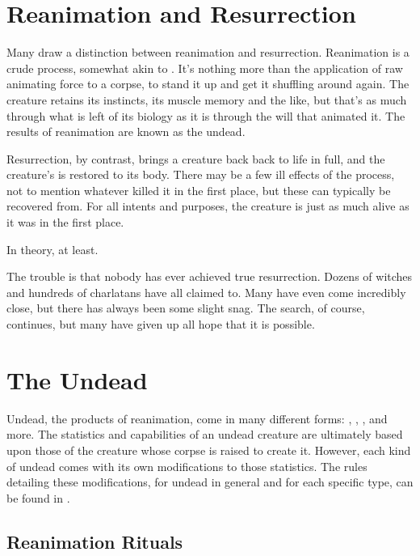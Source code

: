 
\section{Reanimation and Resurrection}

Many  draw a distinction between reanimation and resurrection.
Reanimation is a crude process, somewhat akin to .
It's nothing more than the application of raw animating force to a corpse, to stand it up and get it shuffling around again.
The creature retains its instincts, its muscle memory and the like, but that's as much through what is left of its biology as it is through the will that animated it.
The results of reanimation are known as the undead.

Resurrection, by contrast, brings a creature back back to life in full, and the creature's {\soul} is restored to its body.
There may be a few ill effects of the process, not to mention whatever killed it in the first place, but these can typically be recovered from.
For all intents and purposes, the creature is just as much alive as it was in the first place.

In theory, at least.

The trouble is that nobody has ever achieved true resurrection.
Dozens of witches and hundreds of charlatans have all claimed to.
Many have even come incredibly close, but there has always been some slight snag.
The search, of course, continues, but many have given up all hope that it is possible.

\section{The Undead}

Undead, the products of reanimation, come in many different forms: , , , and more.
The statistics and capabilities of an undead creature are ultimately based upon those of the creature whose corpse is raised to create it.
However, each kind of undead comes with its own modifications to those statistics.
The rules detailing these modifications, for undead in general and for each specific type, can be found in .

\subsection{Reanimation Rituals}

